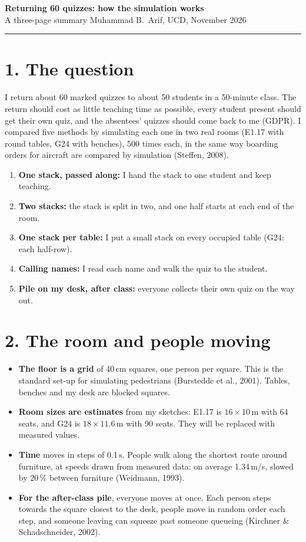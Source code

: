 \documentclass[10.5pt,a4paper]{article}
\begin{document}
{\LARGE\bfseries Returning 60 quizzes: how the simulation works}\\[3pt]
{\large A three-page summary} \hfill Muhammad B.\ Arif, UCD, November 2026
\vspace{4pt}\hrule\vspace{6pt}

\section*{1. The question}
I return about 60 marked quizzes to about 50 students in a 50-minute class. The return should cost as little teaching time as possible, every student present should get their own quiz, and the absentees' quizzes should come back to me (GDPR).
I compared five methods by simulating each one in two real rooms (E1.17 with round tables, G24 with benches), 500 times each, in the same way boarding orders for aircraft are compared by simulation (Steffen, 2008).

\begin{enumerate}[label=\textbf{\arabic*.}]
\item \textbf{One stack, passed along:} I hand the stack to one student and keep teaching.
\item \textbf{Two stacks:} the stack is split in two, and one half starts at each end of the room.
\item \textbf{One stack per table:} I put a small stack on every occupied table (G24: each half-row).
\item \textbf{Calling names:} I read each name and walk the quiz to the student.
\item \textbf{Pile on my desk, after class:} everyone collects their own quiz on the way out.
\end{enumerate}

\section*{2. The room and people moving}
\begin{itemize}
\item \textbf{The floor is a grid} of 40\,cm squares, one person per square. This is the standard set-up for simulating pedestrians (Burstedde et al., 2001). Tables, benches and my desk are blocked squares.
\item \textbf{Room sizes are estimates} from my sketches: E1.17 is $16\times10$\,m with 64 seats, and G24 is $18\times11.6$\,m with 90 seats. They will be replaced with measured values.
\item \textbf{Time} moves in steps of 0.1\,s. People walk along the shortest route around furniture, at speeds drawn from measured data: on average 1.34\,m/s, slowed by 20\,\% between furniture (Weidmann, 1993).
\item \textbf{For the after-class pile}, everyone moves at once. Each person steps towards the square closest to the desk, people move in random order each step, and someone leaving can squeeze past someone queueing (Kirchner \& Schadschneider, 2002).
\end{itemize}
\end{document}
